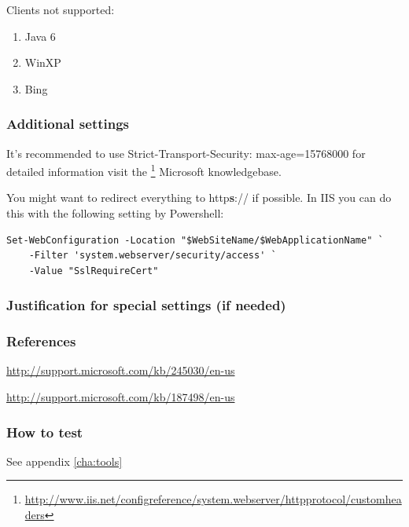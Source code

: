 
Clients not supported:
\begin{enumerate}
  \item Java 6
  \item WinXP
  \item Bing
\end{enumerate}


\subsubsection{Additional settings}
It's recommended to use Strict-Transport-Security: max-age=15768000
for detailed information visit the
\footnote{\url{http://www.iis.net/configreference/system.webserver/httpprotocol/customheaders}}
Microsoft knowledgebase.

You might want to redirect everything to http\textbf{s}:// if possible. In IIS you can do this with the following setting by Powershell:

\begin{lstlisting}[breaklines]
Set-WebConfiguration -Location "$WebSiteName/$WebApplicationName" `
    -Filter 'system.webserver/security/access' `
    -Value "SslRequireCert"
\end{lstlisting}

\subsubsection{Justification for special settings (if needed)}


\subsubsection{References}
\begin{itemize*}
\item \url{http://support.microsoft.com/kb/245030/en-us}
\item \url{http://support.microsoft.com/kb/187498/en-us}
\end{itemize*}



\subsubsection{How to test}
See appendix \ref{cha:tools}

\FloatBarrier %

